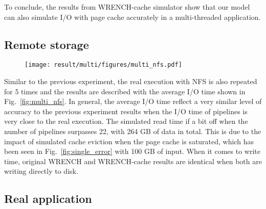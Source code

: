 \documentclass[conference]{IEEEtran}
\begin{document}
            To conclude, the results from WRENCH-cache simulator show that
            our model can also simulate I/O with page cache accurately in a
            multi-threaded application.

        \subsection{Remote storage}

            \begin{figure*}
            \begin{subfigure}{\linewidth}
                \centering
                \texttt{[image: result/multi/figures/multi\_nfs.pdf]}
            \end{subfigure}
            \caption{I/O time of concurrent pipelines with NFS}
            \label{fig:multi_nfs}
            \end{figure*}

            Similar to the previous experiment, the real execution with NFS is also
            repeated for 5 times and the results are described with the average I/O time
            shown in Fig.~\ref{fig:multi_nfs}.
            In general, the average I/O time reflect a very similar level of accuracy
            to the previous experiment results when the I/O time of pipelines
            is very close to the real execution.
            The simulated read time if a bit off when the number of pipelines
            surpasses 22, with 264 GB of data in total.
            This is due to the impact of simulated cache eviction when
            the page cache is saturated, which has been seen in
            Fig.~\ref{fig:single_error} with 100 GB of input.
            When it comes to write time, original WRENCH and WRENCH-cache
            results are identical when both are writing directly to disk.

        \subsection{Real application}
\end{document}
